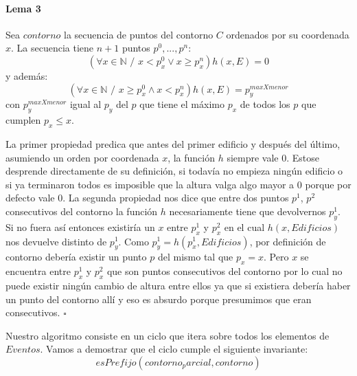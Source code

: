 \paragraph{Lema 3}
Sea $contorno$ la secuencia de puntos del contorno $C$ ordenados por su coordenada $x$. La secuencia tiene 
$n+1$ puntos $p^0,...,p^n$:
\begin{displaymath}
	(\forall x \in \mathbb{N} \text{ / } x < p_x^0 \lor x \geq p_x^n) h(x, E) = 0
\end{displaymath}
y además:
\begin{displaymath}
	(\forall x \in \mathbb{N} \text{ / } x \geq p_x^0 \land x < p_x^n) h(x, E) = p_y^{maxXmenor}
\end{displaymath}
con $p_y^{maxXmenor}$ igual al $p_y$ del $p$ que tiene el máximo $p_x$  de todos los $p$ que cumplen $p_x \leq x$.

La primer propiedad predica que antes del primer edificio y después del último, asumiendo un orden por coordenada $x$,
la función $h$ siempre vale 0. Estose desprende directamente de su definición, si todavía no empieza ningún edificio o
si ya terminaron todos es imposible que la altura valga algo mayor a 0 porque por defecto vale 0.
La segunda propiedad nos dice que entre dos puntos $p^1$, $p^2$ consecutivos del contorno la función $h$ necesariamente tiene
que devolvernos $p_y^1$. Si no fuera así entonces existiría un $x$ entre $p_x^1$ y $p_x^2$ en el cual $h(x, Edificios)$ nos devuelve
distinto de $p_y^1$. Como $p_y^1 = h(p^1_x, Edificios)$, por definición de contorno debería existir un punto $p$ del mismo
tal que $p_x = x$. Pero $x$ se encuentra entre $p_x^1$ y $p_x^2$ que son puntos consecutivos del contorno por lo cual no
puede existir ningún cambio de altura entre ellos ya que si existiera debería haber un punto del contorno allí y eso es
absurdo porque presumimos que eran consecutivos.
$\square$
 
Nuestro algoritmo consiste en un ciclo que itera sobre todos los elementos de $Eventos$. Vamos a demostrar
que el ciclo cumple el siguiente invariante:
\begin{displaymath}
	esPrefijo(contorno_parcial, contorno) 
\end{displaymath}

